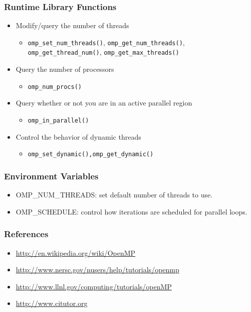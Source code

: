 \documentclass[10pt,t]{beamer}
\begin{document}
\begin{frame}
  \frametitle{Runtime Library Functions}
  \begin{itemize}
    \item Modify/query the number of threads
    \begin{itemize}
      \item \texttt{omp\_set\_num\_threads()}, \texttt{omp\_get\_num\_threads()}, \texttt{omp\_get\_thread\_num()}, \texttt{omp\_get\_max\_threads()}
    \end{itemize}
    \item Query the number of processors
    \begin{itemize}
      \item \texttt{omp\_num\_procs()}
    \end{itemize}
    \item Query whether or not you are in an active parallel region
    \begin{itemize}
      \item \texttt{omp\_in\_parallel()}
    \end{itemize}
    \item Control the behavior of dynamic threads
    \begin{itemize}
      \item \texttt{omp\_set\_dynamic(),omp\_get\_dynamic()}
    \end{itemize}
  \end{itemize}
\end{frame}

\begin{frame}
  \frametitle{Environment Variables}
  \begin{itemize}
    \item OMP\_NUM\_THREADS: set default number of threads to use.
    \item OMP\_SCHEDULE: control how iterations are scheduled for parallel loops.
  \end{itemize}
\end{frame}


\begin{frame}
  \frametitle{References}
  \begin{itemize}
    \item \url{http://en.wikipedia.org/wiki/OpenMP}
    \item \url{http://www.nersc.gov/nusers/help/tutorials/openmp}
    \item \url{http://www.llnl.gov/computing/tutorials/openMP}
    \item \url{http://www.citutor.org}
  \end{itemize}
\end{frame}
\end{document}

